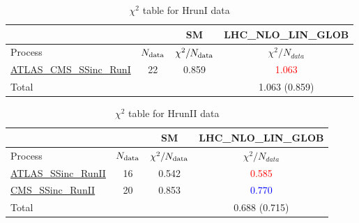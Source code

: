 \documentclass{article}
\begin{document}
\begin{table}[H]
\centering
\begin{tabular}{|l|c|c|c|}
\hline
 \multicolumn{2}{|c|}{} & SM& LHC_NLO_LIN_GLOB\\ \hline
Process & $N_{\rm data}$ & $\chi^ 2/N_{\rm data}$& $\chi^ 2/N_{data}$\\ \hline
\href{https://arxiv.org}{ATLAS_CMS_SSinc_RunI} & 22 & 0.859 & \textcolor{red}                            {1.063} \\ \hline
\hline Total & &  & 1.063 (0.859) \\ \hline
\end{tabular}
\caption{$\chi^2$ table for HrunI data}
\end{table}
\begin{table}[H]
\centering
\begin{tabular}{|l|c|c|c|}
\hline
 \multicolumn{2}{|c|}{} & SM& LHC_NLO_LIN_GLOB\\ \hline
Process & $N_{\rm data}$ & $\chi^ 2/N_{\rm data}$& $\chi^ 2/N_{data}$\\ \hline
\href{https://arxiv.org}{ATLAS_SSinc_RunII} & 16 & 0.542 & \textcolor{red}                            {0.585} \\ \hline
\href{https://arxiv.org}{CMS_SSinc_RunII} & 20 & 0.853 & \textcolor{blue}                            {0.770} \\ \hline
\hline Total & &  & 0.688 (0.715) \\ \hline
\end{tabular}
\caption{$\chi^2$ table for HrunII data}
\end{table}
\end{document}
